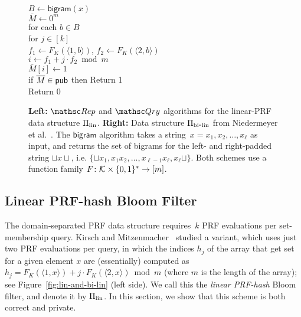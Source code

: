 \begin{figure}[tp]
{\medskip
{}\\
$B \gets \mathsf{bigram}(x)$\\
$\overline{M} \gets 0^m$\\
for each $b \in B$\\
\nudge for $j \in [k]$\\
\nudge\nudge $f_1 \gets F_{K}(\langle 1,b \rangle)$, $f_2 \gets F_{K}(\langle 2,b \rangle)$\\
\nudge\nudge $i \gets f_1+j\cdot f_2 \bmod m$\\
\nudge\nudge $\overline{M}[i] \gets 1$\\
if $\overline{M} \in {\sf pub}$ then Return 1 \\
Return 0
}
\caption{{\bf Left:} $\Rep$ and $\Qry$ algorithms for the linear-PRF
  data structure $\Pi_{\mathrm{lin}}$. {\bf Right:}
Data structure $\Pi_{\mathrm{bi}\mbox{-}\mathrm{lin}}$ from Niedermeyer et
al.~\cite{niedermeyer2014cryptanalysis}. The $\mathsf{bigram}$
algorithm takes a string~$x=x_1,x_2,\ldots,x_\ell$ as input, and
returns the set of bigrams for the left- and right-padded string
$\sqcup x \sqcup$, i.e. $\{\sqcup x_1,
x_1x_2,\ldots,x_{\ell-1}x_\ell,x_\ell\sqcup\}$. Both schemes use a
function family $F\colon {\cal K} \times \{0,1\}^* \to [m]$.
}\label{fig:lin-and-bi-lin} \label{fig:niedermeyer}
\end{figure}

\subsection{Linear PRF-hash Bloom Filter }


The domain-separated PRF data structure requires~$k$ PRF evaluations
per set-membership query.  Kirsch and
Mitzenmacher~\cite{kirsch2006less} studied a variant, which uses
just two PRF evaluations per query, in which the indices $h_j$ of
the array that get set for a given element $x$ are (essentially)
computed as $h_j = F_K(\langle 1,x \rangle) + j\cdot F_K(\langle 2,x
\rangle) \bmod m$ (where $m$ is the length of the array); see
Figure~\ref{fig:lin-and-bi-lin} (left side).
We call this the \emph{linear PRF-hash} Bloom filter, and denote it
by $\Pi_{\mathrm{lin}}$.  In this section, we show that this
scheme is both correct and private.

